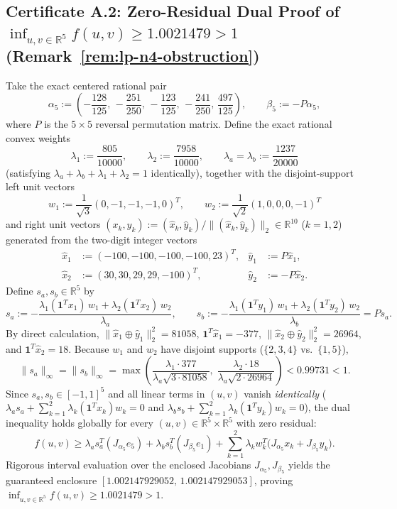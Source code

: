 \documentclass[11pt,a4paper]{article}
\theoremstyle{definition}
\newcommand{\R}{\mathbb{R}}
\newcommand{\one}{\mathbf{1}}
\begin{document}
\subsection*{Certificate A.2: Zero-Residual Dual Proof of $\inf_{u,v \in \R^5} f(u,v) \ge 1.0021479 > 1$ (Remark~\ref{rem:lp-n4-obstruction})}
Take the exact centered rational pair
\[
\alpha_5 := \left(-\frac{128}{125},\, -\frac{251}{250},\, -\frac{123}{125},\, -\frac{241}{250},\, \frac{497}{125}\right), \qquad
\beta_5 := -P\alpha_5,
\]
where $P$ is the $5 \times 5$ reversal permutation matrix. Define the exact rational convex weights
\[
\lambda_1 := \frac{805}{10000}, \qquad \lambda_2 := \frac{7958}{10000}, \qquad \lambda_a = \lambda_b := \frac{1237}{20000}
\]
(satisfying $\lambda_a + \lambda_b + \lambda_1 + \lambda_2 = 1$ identically), together with the disjoint-support left unit vectors
\[
w_1 := \frac{1}{\sqrt{3}}(0, -1, -1, -1, 0)^T, \qquad
w_2 := \frac{1}{\sqrt{2}}(1, 0, 0, 0, -1)^T
\]
and right unit vectors $(x_k, y_k) := (\hat{x}_k, \hat{y}_k) / \|(\hat{x}_k, \hat{y}_k)\|_2 \in \R^{10}$ ($k = 1, 2$) generated from the two-digit integer vectors
\begin{align*}
\hat{x}_1 &:= (-100, -100, -100, -100, 23)^T, & \hat{y}_1 &:= P\hat{x}_1, \\
\hat{x}_2 &:= (30, 30, 29, 29, -100)^T, & \hat{y}_2 &:= -P\hat{x}_2.
\end{align*}
Define $s_a, s_b \in \R^5$ by
\[
s_a := -\frac{\lambda_1(\one^T x_1)\,w_1 + \lambda_2(\one^T x_2)\,w_2}{\lambda_a}, \qquad
s_b := -\frac{\lambda_1(\one^T y_1)\,w_1 + \lambda_2(\one^T y_2)\,w_2}{\lambda_b} = P s_a.
\]
By direct calculation, $\|\hat{x}_1 \oplus \hat{y}_1\|_2^2 = 81058$, $\one^T \hat{x}_1 = -377$, $\|\hat{x}_2 \oplus \hat{y}_2\|_2^2 = 26964$, and $\one^T \hat{x}_2 = 18$. Because $w_1$ and $w_2$ have disjoint supports ($\{2,3,4\}$ vs.\ $\{1,5\}$),
\[
\|s_a\|_\infty = \|s_b\|_\infty
= \max\!\left(\frac{\lambda_1 \cdot 377}{\lambda_a \sqrt{3 \cdot 81058}},\; \frac{\lambda_2 \cdot 18}{\lambda_a \sqrt{2 \cdot 26964}}\right)
< 0.99731 < 1.
\]
Since $s_a, s_b \in [-1, 1]^5$ and all linear terms in $(u, v)$ vanish \emph{identically} ($\lambda_a s_a + \sum_{k=1}^2 \lambda_k (\one^T x_k) w_k = 0$ and $\lambda_b s_b + \sum_{k=1}^2 \lambda_k (\one^T y_k) w_k = 0$), the dual inequality holds globally for every $(u, v) \in \R^5 \times \R^5$ with zero residual:
\[
f(u, v) \ge \lambda_a s_a^T(J_{\alpha_5} e_5) + \lambda_b s_b^T(J_{\beta_5} e_1) + \sum_{k=1}^2 \lambda_k w_k^T\bigl(J_{\alpha_5} x_k + J_{\beta_5} y_k\bigr).
\]
Rigorous interval evaluation over the enclosed Jacobians $J_{\alpha_5}, J_{\beta_5}$ yields the guaranteed enclosure $[1.002147929052,\, 1.002147929053]$, proving $\inf_{u, v \in \R^5} f(u, v) \ge 1.0021479 > 1$.
\end{document}
